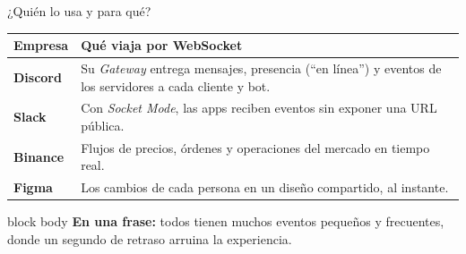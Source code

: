 \documentclass[aspectratio=169,11pt]{beamer}
\newcommand{\bloqueactual}{0}
\newcommand{\quienhabla}{}
\newcommand{\seccion}[2]{\gdef\bloqueactual{#1}\gdef\quienhabla{#2}}
\newcommand{\clave}[1]{%
  \vfill
  \begin{beamercolorbox}[wd=0.97\textwidth,sep=5pt,rounded=true]{block body}
    \small\textcolor{acento}{\textbf{En una frase:}} #1
  \end{beamercolorbox}}
\begin{document}
\seccion{5}{Juan Pablo}
\begin{frame}{¿Quién lo usa y para qué?}
  \small
  \renewcommand{\arraystretch}{1.5}
  \begin{tabularx}{\textwidth}{>{\bfseries}l X}
    \toprule
    Empresa & Qué viaja por WebSocket \\
    \midrule
    Discord & Su \emph{Gateway} entrega mensajes, presencia (“en línea”) y eventos de los servidores a cada cliente y bot. \\
    Slack & Con \emph{Socket Mode}, las apps reciben eventos sin exponer una URL pública. \\
    Binance & Flujos de precios, órdenes y operaciones del mercado en tiempo real. \\
    Figma & Los cambios de cada persona en un diseño compartido, al instante. \\
    \bottomrule
  \end{tabularx}
  \clave{todos tienen muchos eventos pequeños y frecuentes, donde un segundo de retraso arruina la experiencia.}
\end{frame}
\end{document}
